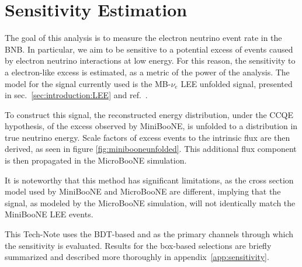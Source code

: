 \section{Sensitivity Estimation }
\label{sec:sensitivity}

The goal of this analysis is to measure the electron neutrino event rate in the BNB. In particular, we aim to be sensitive to a potential excess of events caused by electron neutrino interactions at low energy.
For this reason, the sensitivity to a \nue electron-like excess is estimated, as a metric of the power of the analysis.
The model for the signal currently used is the MB-$\nu_e$ LEE unfolded signal, presented in sec.~\ref{sec:introduction:LEE} and ref.~\cite{C2}.

To construct this signal, the reconstructed energy distribution, under the CCQE hypothesis, of the excess observed by MiniBooNE, is unfolded to a distribution in true neutrino energy.
Scale factors of excess events to the intrinsic \nue flux are then derived, as seen in figure \ref{fig:minibooneunfolded}.
This additional flux component is then propagated in the MicroBooNE simulation.

It is noteworthy that this method has significant limitations, as the cross section model used by MiniBooNE and MicroBooNE are different, implying that the signal, as modeled by the MicroBooNE simulation, will not identically match the MiniBooNE LEE events.

This Tech-Note uses the BDT-based \npsel and \zpsel as the primary channels through which the sensitivity is evaluated. Results for the box-based selections are briefly summarized and described more thoroughly in appendix~\ref{app:sensitivity}.




